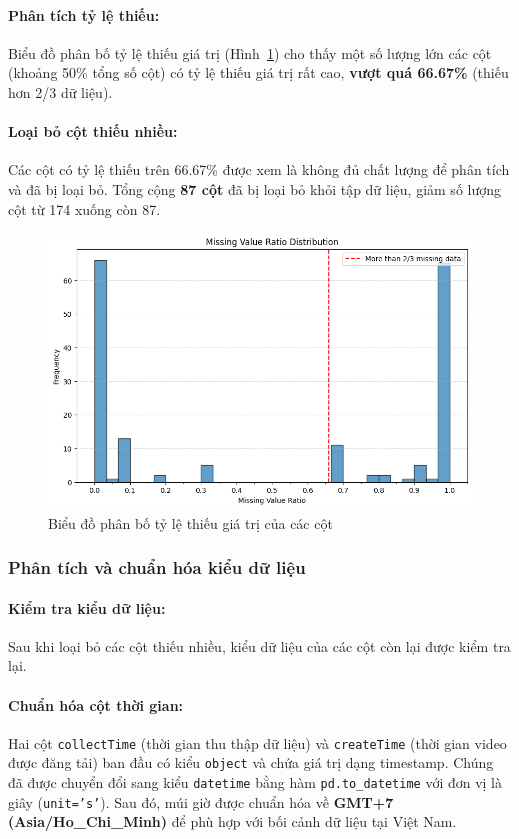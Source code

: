 \paragraph{Phân tích tỷ lệ thiếu:}
Biểu đồ phân bố tỷ lệ thiếu giá trị (Hình~\ref{fig:dep_missing_rate}) cho thấy một số lượng lớn các cột (khoảng 50\% tổng số cột) có tỷ lệ thiếu giá trị rất cao, \textbf{vượt quá 66.67\%} (thiếu hơn 2/3 dữ liệu).

\paragraph{Loại bỏ cột thiếu nhiều:}
Các cột có tỷ lệ thiếu trên 66.67\% được xem là không đủ chất lượng để phân tích và đã bị loại bỏ. Tổng cộng \textbf{87 cột} đã bị loại bỏ khỏi tập dữ liệu, giảm số lượng cột từ 174 xuống còn 87. 

\begin{figure}[H]
    \centering
    \includegraphics[width=.96\linewidth]{img/21127739/dep_missing_rate.png}
    \caption{Biểu đồ phân bố tỷ lệ thiếu giá trị của các cột}
    \label{fig:dep_missing_rate}
\end{figure}

\subsubsection{Phân tích và chuẩn hóa kiểu dữ liệu}

\paragraph{Kiểm tra kiểu dữ liệu:}
Sau khi loại bỏ các cột thiếu nhiều, kiểu dữ liệu của các cột còn lại được kiểm tra lại.

\paragraph{Chuẩn hóa cột thời gian:}
Hai cột \texttt{collectTime} (thời gian thu thập dữ liệu) và \texttt{createTime} (thời gian video được đăng tải) ban đầu có kiểu \texttt{object} và chứa giá trị dạng timestamp. Chúng đã được chuyển đổi sang kiểu \texttt{datetime} bằng hàm \texttt{pd.to\_datetime} với đơn vị là giây (\texttt{unit='s'}). Sau đó, múi giờ được chuẩn hóa về \textbf{GMT+7 (Asia/Ho\_Chi\_Minh)} để phù hợp với bối cảnh dữ liệu tại Việt Nam.

